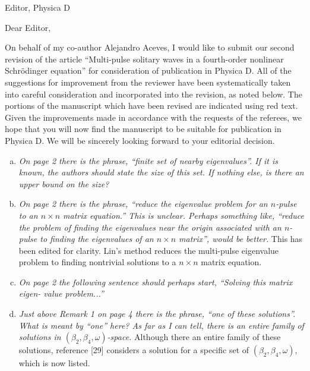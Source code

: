 \documentclass[11pt]{letter}
\begin{document}
\address{Ross Parker \\
Department of Mathematics \\
Southern Methodist University \\
Dallas, TX 75275 \\
\texttt{rhparker@smu.edu}}%
\signature{Ross Parker}
\begin{letter}{Editor, Physica D}

\opening{Dear Editor,}

On behalf of my co-author Alejandro Aceves, I would like to submit our second revision of the article ``Multi-pulse solitary waves in a fourth-order nonlinear {S}chr{\"o}dinger equation'' for consideration of publication in Physica D. All of the suggestions for improvement from the reviewer have been systematically taken into careful consideration and incorporated into the revision, as noted below. The portions of the manuscript which have been revised are indicated using red text. Given the improvements made in accordance with the requests of the referees, we hope that you will now find the manuscript to be suitable for publication in Physica D. We will be sincerely looking forward to your editorial decision.

\begin{enumerate}[(a)]
\item \emph{On page 2 there is the phrase, ``finite set of nearby eigenvalues''. If it is known, the authors should state the size of this set. If nothing else, is there an upper bound on the size?}

\item \emph{On page 2 there is the phrase, ``reduce the eigenvalue problem for an $n$-pulse to an $n\times n$ matrix equation.'' This is unclear. Perhaps something like, ``reduce the problem of finding the eigenvalues near the origin associated with an $n$-pulse to finding the eigenvalues of an $n\times n$ matrix'', would be better.} This has been edited for clarity. Lin's method reduces the multi-pulse eigenvalue problem to finding nontrivial solutions to a $n \times n$ matrix equation. 

\item \emph{On page 2 the following sentence should perhaps start, ``Solving this matrix eigen- value problem...''}

\item \emph{Just above Remark 1 on page 4 there is the phrase, ``one of these solutions''. What is meant by ``one'' here? As far as I can tell, there is an entire family of solutions in $(\beta_2, \beta_4, \omega)$-space.} Although there an entire family of these solutions, reference [29] considers a solution for a specific set of $(\beta_2, \beta_4, \omega)$, which is now listed.


\end{enumerate}
\end{letter}
\end{document}
